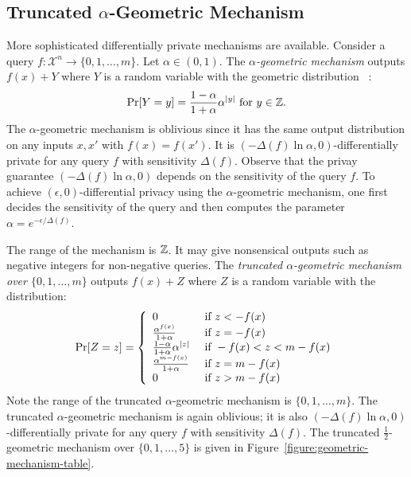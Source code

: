 \subsection{Truncated $\alpha$-Geometric Mechanism}\label{subsec:geometric}
More sophisticated differentially private mechanisms are
available. Consider a query
$f : \mathcal{X}^n \rightarrow \{ 0, 1, \ldots, m \}$. Let $\alpha \in (0, 1)$.
The \emph{$\alpha$-geometric mechanism}
outputs $f(x) + Y$ where $Y$ is a random variable with the geometric
distribution~\cite{GRS:09:UUPM,GRS:12:UUPM} :
\[
\Pr[Y = y] = \frac{1 - \alpha}{1 + \alpha}\alpha^{|y|}
\textmd{ for } y \in \mathbb{Z}.
\]
The $\alpha$-geometric mechanism is oblivious since it has the same
output distribution on any inputs $x, x'$ with $f (x) = f
(x')$. It is $(- {\Delta (f)} \ln \alpha, 0)$-differentially
private for any query $f$ with sensitivity $\Delta (f)$. Observe that
the privay guarantee $(-{\Delta (f)} \ln \alpha, 0)$ depends on the
sensitivity of the query $f$. To achieve $(\epsilon, 0)$-differential
privacy using the $\alpha$-geometric mechanism, one first decides the
sensitivity of the query and then computes the parameter $\alpha =
e^{-{\epsilon}/{{\Delta (f)}}}$. 

The range of the mechanism is $\mathbb{Z}$. It may give nonsensical
outputs such as negative integers for non-negative queries.
The \emph{truncated $\alpha$-geometric mechanism over $\{ 0, 1,
  \ldots, m \}$}
outputs $f (x) + Z$ where $Z$ is a random variable with the 
distribution:
\[
\Pr[Z = z] =
\left\{
  \begin{array}{ll}
    0 & \textmd{ if } z < - f (x) \\
    \frac{\alpha^{f (x)}}{1 + \alpha} & \textmd{ if } z = -f (x)\\
    \frac{1 - \alpha}{1 + \alpha}\alpha^{|z|} &
    \textmd{ if } -f (x) < z < m - f (x)\\
    \frac{\alpha^{m - f (x)}}{1 + \alpha} & \textmd{ if } z = m-f (x)\\
    0 & \textmd{ if } z > m - f (x)
  \end{array}
\right.
\]
Note the range of the truncated $\alpha$-geometric mechanism is
$\{ 0, 1, \ldots, m \}$. The truncated $\alpha$-geometric mechanism is
again oblivious; it is also $(- {\Delta (f)} \ln \alpha, 0)$-differentially
private for any query $f$ with sensitivity $\Delta (f)$.
The truncated $\frac{1}{2}$-geometric mechanism over $\{ 0, 1, \ldots, 5 \}$ is
given in Figure~\ref{figure:geometric-mechanism-table}.

